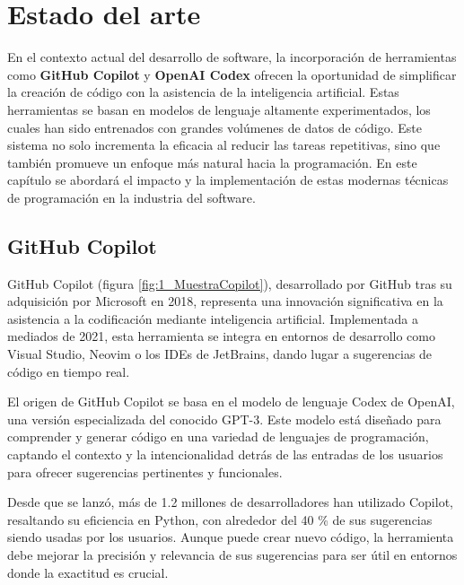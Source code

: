 \chapter{Estado del arte}
\label{chap:estadodelarte}

\lettrine{E}{}n el contexto actual del desarrollo de software, la incorporación de herramientas como \textbf{GitHub Copilot} y \textbf{OpenAI Codex} ofrecen la oportunidad de simplificar la creación de código con la asistencia de la inteligencia artificial. Estas herramientas se basan en modelos de lenguaje altamente experimentados, los cuales han sido entrenados con grandes volúmenes de datos de código. Este sistema no solo incrementa la eficacia al reducir las tareas repetitivas, sino que también promueve un enfoque más natural hacia la programación. En este capítulo se abordará el impacto y la implementación de estas modernas técnicas de programación en la industria del software.


\section{GitHub Copilot}

GitHub Copilot \cite{GitHubCopilot} (figura \ref{fig:1_MuestraCopilot}), desarrollado por GitHub tras su adquisición por Microsoft en 2018, representa una innovación significativa en la asistencia a la codificación mediante inteligencia artificial. Implementada a mediados de 2021, esta herramienta se integra en entornos de desarrollo como Visual Studio, Neovim o los \acrshort{IDE}s de JetBrains, dando lugar a sugerencias de código en tiempo real.

El origen de GitHub Copilot se basa en el modelo de lenguaje Codex de OpenAI, una versión especializada del conocido \acrshort{GPT}-3. Este modelo está diseñado para comprender y generar código en una variedad de lenguajes de programación, captando el contexto y la intencionalidad detrás de las entradas de los usuarios para ofrecer sugerencias pertinentes y funcionales.

Desde que se lanzó, más de 1.2 millones de desarrolladores han utilizado Copilot, resaltando su eficiencia en Python, con alrededor del 40 \% de sus sugerencias siendo usadas por los usuarios. Aunque puede crear nuevo código, la herramienta debe mejorar la precisión y relevancia de sus sugerencias para ser útil en entornos donde la exactitud es crucial.


